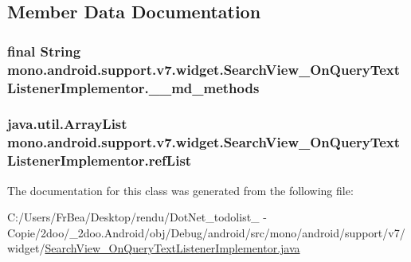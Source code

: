 \subsection{Member Data Documentation}
\hypertarget{classmono_1_1android_1_1support_1_1v7_1_1widget_1_1_search_view___on_query_text_listener_implementor_e251e6ade13e5dd277fac9fdfb2113ff}{
\subsubsection[{\_\-\_\-md\_\-methods}]{\setlength{\rightskip}{0pt plus 5cm}final String {\bf mono.android.support.v7.widget.SearchView\_\-OnQueryTextListenerImplementor.\_\-\_\-md\_\-methods}}}
\label{classmono_1_1android_1_1support_1_1v7_1_1widget_1_1_search_view___on_query_text_listener_implementor_e251e6ade13e5dd277fac9fdfb2113ff}


\hypertarget{classmono_1_1android_1_1support_1_1v7_1_1widget_1_1_search_view___on_query_text_listener_implementor_408d8023bd202047f472d989dd561fba}{
\subsubsection[{refList}]{\setlength{\rightskip}{0pt plus 5cm}java.util.ArrayList {\bf mono.android.support.v7.widget.SearchView\_\-OnQueryTextListenerImplementor.refList}}}
\label{classmono_1_1android_1_1support_1_1v7_1_1widget_1_1_search_view___on_query_text_listener_implementor_408d8023bd202047f472d989dd561fba}




The documentation for this class was generated from the following file:\begin{CompactItemize}
\item 
C:/Users/FrBea/Desktop/rendu/DotNet\_\-todolist\_ - Copie/2doo/\_\-2doo.Android/obj/Debug/android/src/mono/android/support/v7/widget/\hyperlink{_search_view___on_query_text_listener_implementor_8java}{SearchView\_\-OnQueryTextListenerImplementor.java}\end{CompactItemize}
